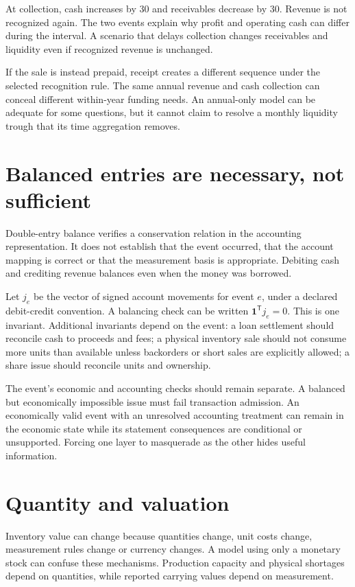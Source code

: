 At collection, cash increases by 30 and receivables decrease by 30. Revenue is not recognized again. The two events explain why profit and operating cash can differ during the interval. A scenario that delays collection changes receivables and liquidity even if recognized revenue is unchanged.

If the sale is instead prepaid, receipt creates a different sequence under the selected recognition rule. The same annual revenue and cash collection can conceal different within-year funding needs. An annual-only model can be adequate for some questions, but it cannot claim to resolve a monthly liquidity trough that its time aggregation removes.

\section{Balanced entries are necessary, not sufficient}
Double-entry balance verifies a conservation relation in the accounting representation. It does not establish that the event occurred, that the account mapping is correct or that the measurement basis is appropriate. Debiting cash and crediting revenue balances even when the money was borrowed.

Let $j_e$ be the vector of signed account movements for event $e$, under a declared debit-credit convention. A balancing check can be written $\mathbf 1^{\mathsf T}j_e=0$. This is one invariant. Additional invariants depend on the event: a loan settlement should reconcile cash to proceeds and fees; a physical inventory sale should not consume more units than available unless backorders or short sales are explicitly allowed; a share issue should reconcile units and ownership.

The event's economic and accounting checks should remain separate. A balanced but economically impossible issue must fail transaction admission. An economically valid event with an unresolved accounting treatment can remain in the economic state while its statement consequences are conditional or unsupported. Forcing one layer to masquerade as the other hides useful information.

\section{Quantity and valuation}
Inventory value can change because quantities change, unit costs change, measurement rules change or currency changes. A model using only a monetary stock can confuse these mechanisms. Production capacity and physical shortages depend on quantities, while reported carrying values depend on measurement.


